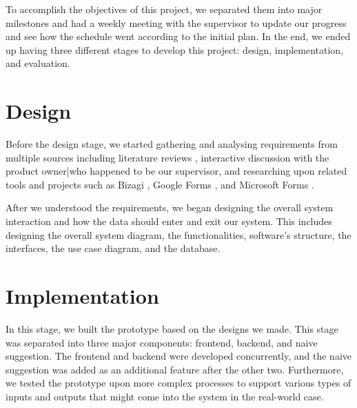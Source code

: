 To accomplish the objectives of this project, we separated them into major milestones and had a weekly meeting with the supervisor to update our progress and see how the schedule went according to the initial plan. In the end, we ended up having three different stages to develop this project: design, implementation, and evaluation.

\section{Design}
Before the design stage, we started gathering and analysing requirements from multiple sources including literature reviews \cite{checklistdesign, papapanagiotou2017workflowfm}, interactive discussion with the product owner|who happened to be our supervisor, and researching upon related tools and projects such as Bizagi \cite{bizagi}, Google Forms \cite{googleforms}, and Microsoft Forms \cite{msforms}.

After we understood the requirements, we began designing the overall system interaction and how the data should enter and exit our system. This includes designing the overall system diagram, the functionalities, software's structure, the interfaces, the use case diagram, and the database.


\section{Implementation}
In this stage, we built the prototype based on the designs we made. This stage was separated into three major components: frontend, backend, and naive suggestion. The frontend and backend were developed concurrently, and the naive suggestion was added as an additional feature after the other two. Furthermore, we tested the prototype upon more complex processes to support various types of inputs and outputs that might come into the system in the real-world case.



